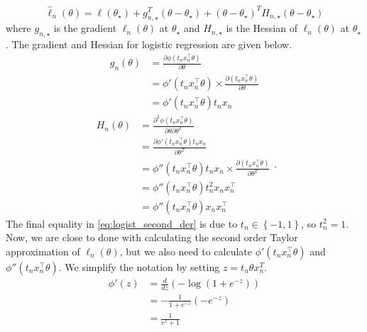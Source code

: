 \begin{equation}\label{eq:Taylor_exp}
    \hat{\ell}_n\left(\theta\right) = \ell\left(\theta_{\star}\right) + g^T_{n, \star}\left(\theta - \theta_{\star}\right) + \left(\theta - \theta_{\star}\right)^TH_{n, \star}\left(\theta - \theta_{\star}\right)  
\end{equation}
where $g_{n, \star}$ is the gradient $\ell_n\left(\theta\right)$ at $\theta_{\star}$ and $H_{n, \star}$ is the Hessian of $\ell_n\left(\theta\right)$ at $\theta_{\star}$. The gradient and Hessian for logistic regression are given below. 
\begin{equation}
\begin{split}
    g_n\left(\theta\right) &= \frac{\partial\phi\left(t_nx_n^{\top}\theta \right)}{\partial\theta}\\ 
    &= \phi'\left(t_n x_n^{\top}\theta \right)\times \frac{\partial\left(t_n x_n^{\top} \theta \right)}{\partial\theta}  \\
    & = \phi'\left(t_n x_n^{\top}\theta \right) t_n x_n
\end{split}
\end{equation}
\begin{equation}\label{eq:logist_second_der}
    \begin{split}
    H_n\left(\theta\right) &= \frac{\partial^2\phi\left(t_n x_n^{\top}\theta  \right)}{\partial\theta\partial\theta^T} \\
    &= \frac{\partial \phi'\left(t_n x_n^{\top}\theta \right) t_n x_n}{\partial \theta^T} \\
    & = \phi''\left(t_n x_n^{\top} \theta \right) t_n x_n \times \frac{\partial\left(t_nx_n^{\top}\theta \right)}{\partial \theta^T} \\
    & = \phi''\left(t_n x_n^{\top}\theta \right) t_n^2 x_n x_n^{\top} \\
    & = \phi''\left(t_n x_n^{\top}\theta \right)x_n x_n^{\top}
\end{split}. 
\end{equation}
The final equality in \eqref{eq:logist_second_der} is due to $t_n \in \left\{-1, 1\right\}$, so $t_n^2 = 1$. 
Now, we are close to done with calculating the second order Taylor approximation of $\ell_n\left(\theta\right)$, but we also need to calculate $\phi'\left(t_n x_n^{\top}\theta \right)$ and $\phi''\left(t_n x_n^{\top}\theta \right)$. We simplify the notation by setting $z = t_n\theta x_n^T$. 
\begin{equation}\label{eq:logist_first_der} 
\begin{split}
\phi'\left(z\right) &= \frac{d}{dz} \left( - \log\left(1 + e^{-z}\right)\right)\\ &= - \frac{1}{1 + e^{-z}} \left(-e^{-z}\right) \\
& = \frac{1}{e^z + 1}
\end{split}
\end{equation}
